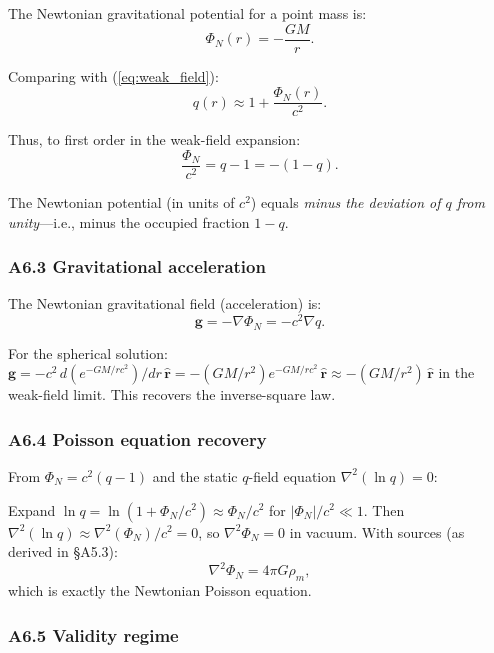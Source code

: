 \documentclass[reprint]{revtex4-2}
\begin{document}
The Newtonian gravitational potential for a point mass is:
\begin{equation}
\Phi_N(r) = -\frac{GM}{r}.
\end{equation}

Comparing with (\ref{eq:weak_field}):
\begin{equation}
q(r) \approx 1 + \frac{\Phi_N(r)}{c^2}.
\end{equation}

Thus, to first order in the weak-field expansion:
\begin{equation}
\boxed{\frac{\Phi_N}{c^2} = q - 1 = -(1-q)}.
\label{eq:newton_correspondence}
\end{equation}

The Newtonian potential (in units of $c^2$) equals \emph{minus the deviation of $q$ from unity}---i.e., minus the occupied fraction $1-q$.

\subsubsection{A6.3 Gravitational acceleration}

The Newtonian gravitational field (acceleration) is:
\begin{equation}
\mathbf{g} = -\nabla\Phi_N = -c^2\nabla q.
\end{equation}

For the spherical solution: $\mathbf{g} = -c^2\,d(e^{-GM/rc^2})/dr\,\hat{\mathbf{r}} = -(GM/r^2)e^{-GM/rc^2}\,\hat{\mathbf{r}} \approx -(GM/r^2)\,\hat{\mathbf{r}}$ in the weak-field limit. This recovers the inverse-square law.

\subsubsection{A6.4 Poisson equation recovery}

From $\Phi_N = c^2(q-1)$ and the static $q$-field equation $\nabla^2(\ln q)=0$:

Expand $\ln q = \ln(1 + \Phi_N/c^2) \approx \Phi_N/c^2$ for $|\Phi_N|/c^2 \ll 1$. Then $\nabla^2(\ln q) \approx \nabla^2(\Phi_N)/c^2 = 0$, so $\nabla^2\Phi_N=0$ in vacuum. With sources (as derived in \S A5.3):
\begin{equation}
\nabla^2\Phi_N = 4\pi G\rho_m,
\end{equation}
which is exactly the Newtonian Poisson equation.

\subsubsection{A6.5 Validity regime}
\end{document}
